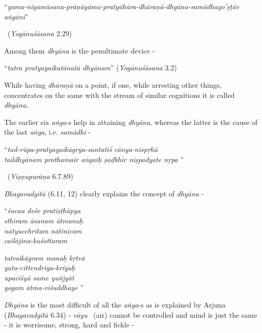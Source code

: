 \begin{myquote}
“\textit{yama-niyamāsana-prāṇāyāma-pratyāhāra-dhāraṇā-dhyāna-samādhayo’ṣṭāv aṅgāni}” 

~\hfill (\textit{Yogānuśāsana} 2.29)
\end{myquote}

Among them \textit{dhyāna} is the penultimate device -

\begin{myquote}
“\textit{tatra pratyayaikatānatā dhyānam}” (\textit{Yogānuśāsana} 3.2)
\end{myquote}

While having \textit{dhāraṇā} on a point, if one, while arresting other things, concentrates on the same with the stream of similar cognitions it is called \textit{dhyāna}.

The earlier six \textit{aṅga}-s help in attaining \textit{dhyāna}, whereas the latter is the cause of the last \textit{aṅga}, i.e. \textit{samādhi} -

\begin{myquote}
“\textit{tad-rūpa-pratyayaikāgrya-santatiś cānya-nispṛhā }\\ \textit{taddhyānam prathamair aṅgaiḥ ṣaḍbhir niṣpadyate nṛpa} ” 

~\hfill (\textit{Viṣṇupurāṇa} 6.7.89)
\end{myquote}

\textit{Bhagavadgītā} (6.11, 12) clearly explains the concept of \textit{dhyāna} -

\begin{centerquote}
“\textit{śucau deśe pratiṣṭhāpya}\\ \textit{sthiram āsanam ātmanaḥ }\\ \textit{nātyucchritam nātinīcam}\\ \textit{cailājina-kuśottaram }
\end{centerquote}

\begin{centerquote}
\textit{tatraikāgram manaḥ kṛtvā}\\ \textit{yata-cittendriya-kriyaḥ }\\ \textit{upaviśyā same yuñjyāt}\\ \textit{yogam ātma-viśuddhaye} ”
\end{centerquote}

\textit{Dhyāna} is the most difficult of all the \textit{aṅga}-s as is explained by Arjuna (\textit{Bhagavadgītā} 6.34) - \textit{vāyu}  (air) cannot be controlled and mind is just the same - it is worrisome, strong, hard and fickle -

